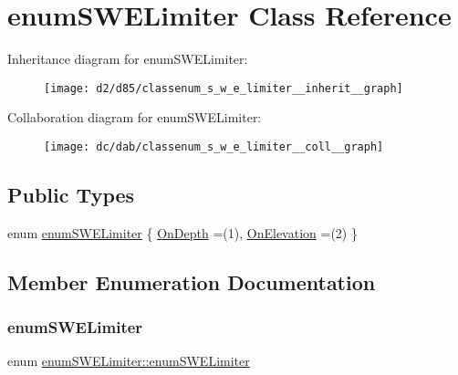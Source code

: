 \hypertarget{classenum_s_w_e_limiter}{}\section{enum\+S\+W\+E\+Limiter Class Reference}
\label{classenum_s_w_e_limiter}


Inheritance diagram for enum\+S\+W\+E\+Limiter\+:
\nopagebreak
\begin{figure}[H]
\begin{center}
\leavevmode
\texttt{[image: d2/d85/classenum\_s\_w\_e\_limiter\_\_inherit\_\_graph]}
\end{center}
\end{figure}


Collaboration diagram for enum\+S\+W\+E\+Limiter\+:
\nopagebreak
\begin{figure}[H]
\begin{center}
\leavevmode
\texttt{[image: dc/dab/classenum\_s\_w\_e\_limiter\_\_coll\_\_graph]}
\end{center}
\end{figure}
\subsection*{Public Types}
\begin{DoxyCompactItemize}
\item 
enum \hyperlink{classenum_s_w_e_limiter_af871fbc2d438e281b68cad82e195a998}{enum\+S\+W\+E\+Limiter} \{ \hyperlink{classenum_s_w_e_limiter_af871fbc2d438e281b68cad82e195a998a6397488dc9052c9ad5fa3a52ae3f237a}{On\+Depth} =(1), 
\hyperlink{classenum_s_w_e_limiter_af871fbc2d438e281b68cad82e195a998a0ffec72b30cbf96645139e0db03ca2a4}{On\+Elevation} =(2)
 \}
\end{DoxyCompactItemize}


\subsection{Member Enumeration Documentation}
\mbox{\label{classenum_s_w_e_limiter_af871fbc2d438e281b68cad82e195a998}} 
\subsubsection{\texorpdfstring{enum\+S\+W\+E\+Limiter}{enumSWELimiter}}
{\footnotesize\ttfamily enum \hyperlink{classenum_s_w_e_limiter_af871fbc2d438e281b68cad82e195a998}{enum\+S\+W\+E\+Limiter\+::enum\+S\+W\+E\+Limiter}}

